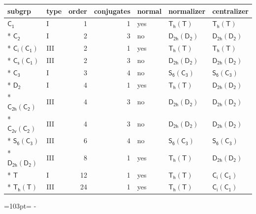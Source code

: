 \documentclass[10pt,a4paper]{article}
\newcommand{\needspace}[1]{\par\penalty-100\begingroup\dimen0=#1\relax\dimen2=\pagegoal
  \advance\dimen2-\pagetotal\ifdim\dimen0>\dimen2\relax\ifdim\dimen2>0pt\vfil\break\fi\fi
  \endgroup}
\numberwithin{equation}{section}
\newcommand{\grp}[1]{\mathsf{#1}}
\begin{document}
{\small\begin{longtable}{@{}llrrlll@{}}\toprule
subgrp & type & order & conjugates & normal & normalizer & centralizer\\\midrule\endhead
\bottomrule\endfoot\endlastfoot
\href{../../../rotation/data/pdf/C1.pdf}{$\grp{C_{1}}$} & I & 1 & 1 & yes & \href{Th-T.pdf}{$\grp{T_{h}}(\grp{T})$} & \href{Th-T.pdf}{$\grp{T_{h}}(\grp{T})$}\\*
\href{../../../rotation/data/pdf/C2.pdf}{$\grp{C_{2}}$} & I & 2 & 3 & no & \href{D2h-D2.pdf}{$\grp{D_{2h}}(\grp{D_{2}})$} & \href{D2h-D2.pdf}{$\grp{D_{2h}}(\grp{D_{2}})$}\\*
\href{S2-C1.pdf}{$\grp{C_{i}}(\grp{C_{1}})$} & III & 2 & 1 & yes & \href{Th-T.pdf}{$\grp{T_{h}}(\grp{T})$} & \href{Th-T.pdf}{$\grp{T_{h}}(\grp{T})$}\\*
\href{C1v-C1.pdf}{$\grp{C_{s}}(\grp{C_{1}})$} & III & 2 & 3 & no & \href{D2h-D2.pdf}{$\grp{D_{2h}}(\grp{D_{2}})$} & \href{D2h-D2.pdf}{$\grp{D_{2h}}(\grp{D_{2}})$}\\*
\href{../../../rotation/data/pdf/C3.pdf}{$\grp{C_{3}}$} & I & 3 & 4 & no & \href{S6-C3.pdf}{$\grp{S_{6}}(\grp{C_{3}})$} & \href{S6-C3.pdf}{$\grp{S_{6}}(\grp{C_{3}})$}\\*
\href{../../../rotation/data/pdf/D2.pdf}{$\grp{D_{2}}$} & I & 4 & 1 & yes & \href{Th-T.pdf}{$\grp{T_{h}}(\grp{T})$} & \href{D2h-D2.pdf}{$\grp{D_{2h}}(\grp{D_{2}})$}\\*
\href{C2h-C2.pdf}{$\grp{C_{2h}}(\grp{C_{2}})$} & III & 4 & 3 & no & \href{D2h-D2.pdf}{$\grp{D_{2h}}(\grp{D_{2}})$} & \href{D2h-D2.pdf}{$\grp{D_{2h}}(\grp{D_{2}})$}\\*
\href{C2v-C2.pdf}{$\grp{C_{2v}}(\grp{C_{2}})$} & III & 4 & 3 & no & \href{D2h-D2.pdf}{$\grp{D_{2h}}(\grp{D_{2}})$} & \href{D2h-D2.pdf}{$\grp{D_{2h}}(\grp{D_{2}})$}\\*
\href{S6-C3.pdf}{$\grp{S_{6}}(\grp{C_{3}})$} & III & 6 & 4 & no & \href{S6-C3.pdf}{$\grp{S_{6}}(\grp{C_{3}})$} & \href{S6-C3.pdf}{$\grp{S_{6}}(\grp{C_{3}})$}\\*
\href{D2h-D2.pdf}{$\grp{D_{2h}}(\grp{D_{2}})$} & III & 8 & 1 & yes & \href{Th-T.pdf}{$\grp{T_{h}}(\grp{T})$} & \href{D2h-D2.pdf}{$\grp{D_{2h}}(\grp{D_{2}})$}\\*
\href{../../../rotation/data/pdf/T.pdf}{$\grp{T}$} & I & 12 & 1 & yes & \href{Th-T.pdf}{$\grp{T_{h}}(\grp{T})$} & \href{S2-C1.pdf}{$\grp{C_{i}}(\grp{C_{1}})$}\\*
\href{Th-T.pdf}{$\grp{T_{h}}(\grp{T})$} & III & 24 & 1 & yes & \href{Th-T.pdf}{$\grp{T_{h}}(\grp{T})$} & \href{S2-C1.pdf}{$\grp{C_{i}}(\grp{C_{1}})$}\\
\bottomrule\end{longtable}}
\needspace{103pt}
\end{document}
